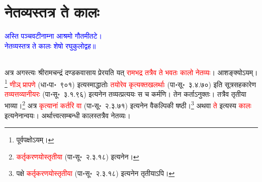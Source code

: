 \section[नेतव्यस्तत्र ते कालः]{नेतव्यस्तत्र ते कालः}
\centering\textcolor{blue}{अस्ति पञ्चवटीनाम्ना आश्रमो गौतमीतटे।\nopagebreak\\
नेतव्यस्तत्र ते कालः शेषो रघुकुलोद्वह॥}\nopagebreak\\
\\
\begin{sloppypar}\justifying\noindent\hspace{10mm} अत्र अगस्त्यः श्रीरामचन्द्रं दण्डक\-वासाय प्रेरयति यत् \textcolor{red}{रामभद्र तत्रैव ते भवतः कालो नेतव्यः}। आशङ्क्योऽयम्।\footnote{पूर्वपक्षोऽयम्।} \textcolor{red}{णीञ् प्रापणे} (धा॰पा॰~९०१) इत्यस्माद्धातोः \textcolor{red}{तयोरेव कृत्य\-क्त\-खलर्थाः} (पा॰सू॰~३.४.७०) इति सूत्र\-सहकारेण \textcolor{red}{तव्यत्तव्यानीयरः} (पा॰सू॰~३.१.९६) इत्यनेन तव्यत्प्रत्ययः स च कर्मणि। तेन कर्ताऽनुक्तः। तत्रैव तृतीया भाव्या।\footnote{\textcolor{red}{कर्तृ\-करणयोस्तृतीया} (पा॰सू॰~२.३.१८) इत्यनेन।} अत्र \textcolor{red}{कृत्यानां कर्तरि वा} (पा॰सू॰~२.३.७१) इत्यनेन वैकल्पिकी षष्ठी।\footnote{पक्षे \textcolor{red}{कर्तृ\-करणयोस्तृतीया} (पा॰सू॰~२.३.१८) इत्यनेन तृतीयाऽपि।} अथवा \textcolor{red}{ते} इत्यस्य \textcolor{red}{कालः} इत्यनेनान्वयः। अर्थात्त्वत्सम्बन्धी कालस्तत्रैव नेतव्यः।

\end{sloppypar}
